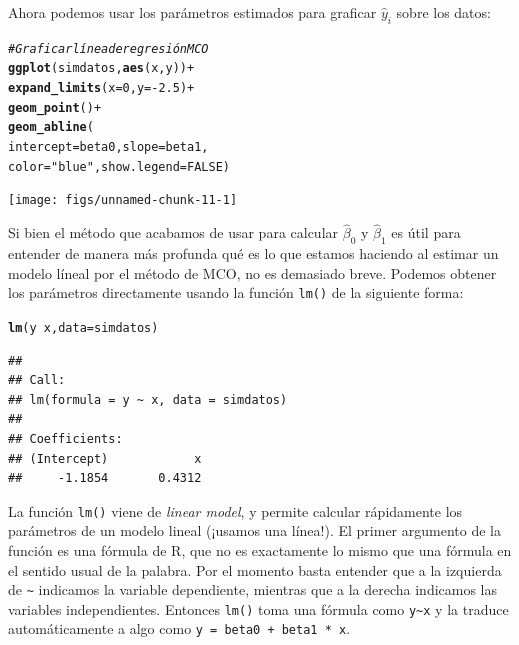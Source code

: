 \documentclass{article}\usepackage[]{graphicx}\usepackage[]{color}
\makeatletter
\newcommand{\hlnum}[1]{\textcolor[rgb]{0.686,0.059,0.569}{#1}}%
\newcommand{\hlstr}[1]{\textcolor[rgb]{0.192,0.494,0.8}{#1}}%
\newcommand{\hlcom}[1]{\textcolor[rgb]{0.678,0.584,0.686}{\textit{#1}}}%
\newcommand{\hlopt}[1]{\textcolor[rgb]{0,0,0}{#1}}%
\newcommand{\hlstd}[1]{\textcolor[rgb]{0.345,0.345,0.345}{#1}}%
\newcommand{\hlkwc}[1]{\textcolor[rgb]{0.333,0.667,0.333}{#1}}%
\newcommand{\hlkwd}[1]{\textcolor[rgb]{0.737,0.353,0.396}{\textbf{#1}}}%
\newenvironment{kframe}{%
 \def\at@end@of@kframe{}%
 \ifinner\ifhmode%
  \def\at@end@of@kframe{\end{minipage}}%
  \begin{minipage}{\columnwidth}%
 \fi\fi%
 \def\FrameCommand##1{\hskip\@totalleftmargin \hskip-\fboxsep
 \colorbox{shadecolor}{##1}\hskip-\fboxsep
     \hskip-\linewidth \hskip-\@totalleftmargin \hskip\columnwidth}%
 \MakeFramed {\advance\hsize-\width
   \@totalleftmargin\z@ \linewidth\hsize
   \@setminipage}}%
 {\par\unskip\endMakeFramed%
 \at@end@of@kframe}
\newenvironment{knitrout}{}{} %
\newcommand*{\eng}[1]{\textsl{#1}}
\makeatother
\begin{document}
Ahora podemos usar los parámetros estimados para graficar $\hat y_i$ sobre los datos:

\begin{knitrout}
\color{fgcolor}\begin{kframe}
\begin{alltt}
\hlcom{# Graficar línea de regresión MCO}
\hlkwd{ggplot}\hlstd{(simdatos,} \hlkwd{aes}\hlstd{(x,y))} \hlopt{+}
  \hlkwd{expand_limits}\hlstd{(}\hlkwc{x} \hlstd{=} \hlnum{0}\hlstd{,} \hlkwc{y} \hlstd{=} \hlopt{-}\hlnum{2.5}\hlstd{)} \hlopt{+}
  \hlkwd{geom_point}\hlstd{()} \hlopt{+}
  \hlkwd{geom_abline}\hlstd{(}
    \hlkwc{intercept} \hlstd{= beta0,} \hlkwc{slope} \hlstd{= beta1,}
    \hlkwc{color} \hlstd{=} \hlstr{"blue"}\hlstd{,} \hlkwc{show.legend} \hlstd{=} \hlnum{FALSE} \hlstd{)}
\end{alltt}
\end{kframe}

{\centering \texttt{[image: figs/unnamed-chunk-11-1]} 

}



\end{knitrout}

Si bien el método que acabamos de usar para calcular $\hat\beta_0$ y $\hat\beta_1$ es útil para entender de manera más profunda qué es lo que estamos haciendo al estimar un modelo líneal por el método de MCO, no es demasiado breve. Podemos obtener los parámetros directamente usando la función \verb|lm()| de la siguiente forma:

\begin{knitrout}
\color{fgcolor}\begin{kframe}
\begin{alltt}
\hlkwd{lm}\hlstd{(y} \hlopt{~} \hlstd{x,} \hlkwc{data} \hlstd{= simdatos)}
\end{alltt}
\begin{verbatim}
## 
## Call:
## lm(formula = y ~ x, data = simdatos)
## 
## Coefficients:
## (Intercept)            x  
##     -1.1854       0.4312
\end{verbatim}
\end{kframe}
\end{knitrout}

La función \verb|lm()| viene de \eng{linear model}, y permite calcular rápidamente los parámetros de un modelo lineal (¡usamos una línea!). El primer argumento de la función es una fórmula de R, que no es exactamente lo mismo que una fórmula en el sentido usual de la palabra. Por el momento basta entender que a la izquierda de \verb|~| indicamos la variable dependiente, mientras que a la derecha indicamos las variables independientes. Entonces \verb|lm()| toma una fórmula como \verb|y~x| y la traduce automáticamente a algo como \verb|y = beta0 + beta1 * x|.
\end{document}
